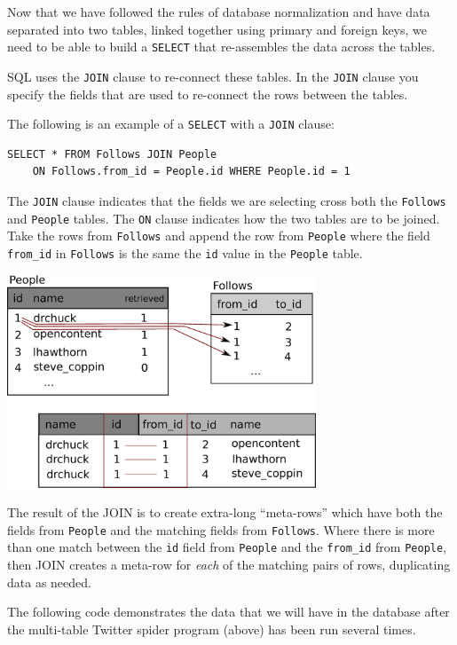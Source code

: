 \documentclass[11pt]{book}
\begin{document}
Now that we have followed the rules of database normalization
and have data separated into two tables, linked together using
primary and foreign keys, we need to be able to build a 
{\tt SELECT} that re-assembles the data across the tables.

SQL uses the {\tt JOIN} clause to re-connect these tables.  
In the {\tt JOIN} clause you specify the fields that are used 
to re-connect the rows between the tables.

The following is an example of a {\tt SELECT} with a 
{\tt JOIN} clause:

\beforeverb
\begin{verbatim}
SELECT * FROM Follows JOIN People 
    ON Follows.from_id = People.id WHERE People.id = 1
\end{verbatim}
\afterverb
%
The {\tt JOIN} clause indicates that the fields we are selecting
cross both the {\tt Follows} and {\tt People} tables.  The {\tt ON}
clause indicates how the two tables are to be joined.   Take the rows
from {\tt Follows} and append the row from {\tt People} where the
field \verb"from_id" in {\tt Follows} is the same the {\tt id} value
in the {\tt People} table.

\beforefig
\centerline{\includegraphics[height=2.50in]{figs2/join.eps}}
\afterfig

The result of the JOIN is to create extra-long ``meta-rows'' which have both 
the fields from {\tt People} and the matching fields from {\tt Follows}.
Where there is more than one match between the {\tt id} field from {\tt People}
and the \verb"from_id" from {\tt People}, then JOIN creates a meta-row 
for \emph{each} of the matching pairs of rows, duplicating data as needed.

The following code demonstrates the data that we will have in the 
database after the multi-table Twitter spider program (above) has
been run several times.
\end{document}
